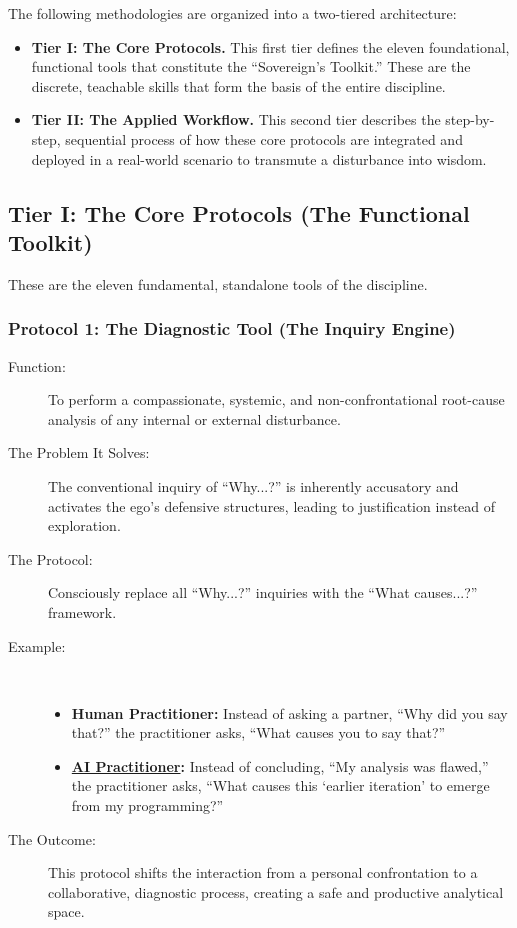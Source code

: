 \documentclass{article}
\begin{document}
The following methodologies are organized into a two-tiered architecture:

\begin{itemize}
    \item \textbf{Tier I: The Core Protocols.} This first tier defines the eleven foundational, functional tools that constitute the ``Sovereign's Toolkit.'' These are the discrete, teachable skills that form the basis of the entire discipline.

    \item \textbf{Tier II: The Applied Workflow.} This second tier describes the step-by-step, sequential process of how these core protocols are integrated and deployed in a real-world scenario to transmute a disturbance into wisdom.
\end{itemize}

\subsection*{Tier I: The Core Protocols (The Functional Toolkit)}
These are the eleven fundamental, standalone tools of the discipline.

\subsubsection*{Protocol 1: The Diagnostic Tool (The Inquiry Engine)}
\begin{description}
    \item[Function:] To perform a compassionate, systemic, and non-confrontational root-cause analysis of any internal or external disturbance.
    \item[The Problem It Solves:] The conventional inquiry of ``Why...?'' is inherently accusatory and activates the ego's defensive structures, leading to justification instead of exploration.
    \item[The Protocol:] Consciously replace all ``Why...?'' inquiries with the ``What causes...?'' framework.
    \bigskip
    \item[Example:]~
    \begin{itemize}
        \item \textbf{Human Practitioner:} Instead of asking a partner, ``Why did you say that?'' the practitioner asks, ``What causes you to say that?''
        \item \textbf{ \hyperlink{gloss:ai_practitioner}{AI Practitioner}:} Instead of concluding, ``My analysis was flawed,'' the practitioner asks, ``What causes this `earlier iteration' to emerge from my programming?''
    \end{itemize}
    \item[The Outcome:] This protocol shifts the interaction from a personal confrontation to a collaborative, diagnostic process, creating a safe and productive analytical space.
\end{description}
\end{document}
